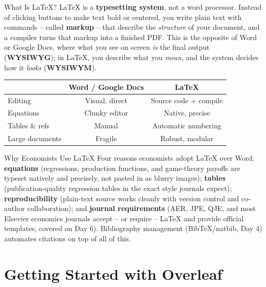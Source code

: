\documentclass[11pt,aspectratio=169]{beamer}
\begin{document}
\begin{frame}{What Is LaTeX?}
  \small
  LaTeX is a \textbf{typesetting system}, not a word processor. Instead
  of clicking buttons to make text bold or centered, you write plain
  text with commands -- called \textbf{markup} -- that describe the
  \emph{structure} of your document, and a compiler turns that markup
  into a finished PDF. This is the opposite of Word or Google Docs,
  where what you see on screen \emph{is} the final output
  (\textbf{WYSIWYG}); in LaTeX, you describe what you \emph{mean}, and
  the system decides how it \emph{looks} (\textbf{WYSIWYM}).
  \vspace{6pt}
  \begin{center}
  \begin{tabular}{lcc}
    \toprule
    & \textbf{Word / Google Docs} & \textbf{LaTeX} \\
    \midrule
    Editing & Visual, direct & Source code + compile \\
    Equations & Clunky editor & Native, precise \\
    Tables \& refs & Manual & Automatic numbering \\
    Large documents & Fragile & Robust, modular \\
    \bottomrule
  \end{tabular}
  \end{center}
\end{frame}

\begin{frame}{Why Economists Use LaTeX}
  \small
  Four reasons economists adopt LaTeX over Word: \textbf{equations}
  (regressions, production functions, and game-theory payoffs are
  typeset natively and precisely, not pasted in as blurry images);
  \textbf{tables} (publication-quality regression tables in the exact
  style journals expect); \textbf{reproducibility} (plain-text source
  works cleanly with version control and co-author collaboration); and
  \textbf{journal requirements} (AER, JPE, QJE, and most Elsevier
  economics journals accept -- or require -- LaTeX and provide official
  templates, covered on Day 6). Bibliography management (BibTeX/natbib,
  Day 4) automates citations on top of all of this.
\end{frame}

\section{Getting Started with Overleaf}
\end{document}
